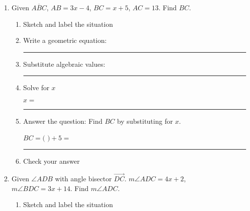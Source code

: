 \documentclass[12pt, oneside]{article}
\begin{document}
\begin{enumerate}
        \item Given $\overline{ABC}$, $AB=3x-4$, $BC=x+5$, $AC=13$. Find ${BC}$.
        \begin{enumerate}
          \item Sketch and label the situation
          \begin{flushright}
          \end{flushright} \vspace{2cm}
          \item Write a geometric equation: \rule{5cm}{0.15mm} \vspace{1.5cm}
          \item Substitute algebraic values: \rule{5cm}{0.15mm} \bigskip
          \item Solve for $x$
          \vspace{5cm}
          \begin{center} $x=$ \rule{1cm}{0.15mm} \end{center} \bigskip
          \item Answer the question: Find $BC$ by substituting for $x$. \bigskip
          \begin{center} $BC=($ \hspace{1cm} $)+5=$ \rule{1cm}{0.15mm} \end{center} \bigskip
          \item Check your answer
        \end{enumerate}
        \vspace{2cm}

  \newpage
        \item Given $\angle ADB$ with angle bisector $\overrightarrow{DC}$. $m\angle ADC = 4x+2$, $m\angle BDC = 3x+14$. Find $m\angle ADC$.  %
        \begin{enumerate}
          \item Sketch and label the situation
          \begin{flushright}
          \end{flushright}
          \vspace{.5cm}


\end{enumerate}
\end{enumerate}
\end{document}
